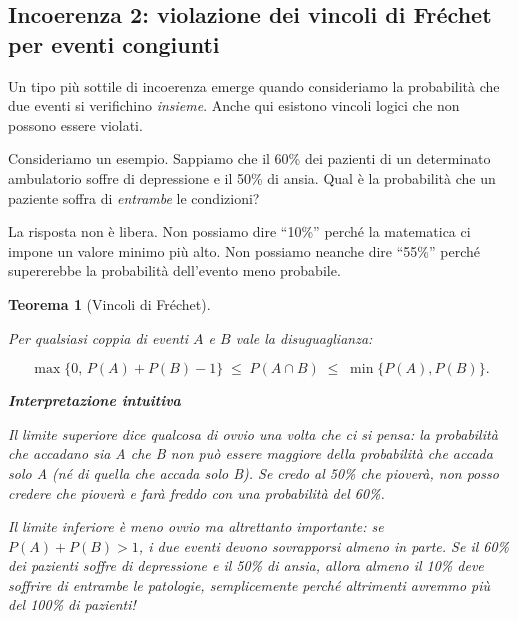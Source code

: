 \documentclass[
  italian,
  letterpaper,
  a4paper,
  11pt,
  open=any]{scrbook}
\theoremstyle{plain}
\newtheorem{theorem}{Teorema}[chapter]
\theoremstyle{definition}
\theoremstyle{definition}
\theoremstyle{remark}
\begin{document}
\subsection{Incoerenza 2: violazione dei vincoli di Fréchet per eventi
congiunti}\label{incoerenza-2-violazione-dei-vincoli-di-fruxe9chet-per-eventi-congiunti}

Un tipo più sottile di incoerenza emerge quando consideriamo la
probabilità che due eventi si verifichino \emph{insieme}. Anche qui
esistono vincoli logici che non possono essere violati.

Consideriamo un esempio. Sappiamo che il 60\% dei pazienti di un
determinato ambulatorio soffre di depressione e il 50\% di ansia. Qual è
la probabilità che un paziente soffra di \emph{entrambe} le condizioni?

La risposta non è libera. Non possiamo dire ``10\%'' perché la
matematica ci impone un valore minimo più alto. Non possiamo neanche
dire ``55\%'' perché supererebbe la probabilità dell'evento meno
probabile.

\begin{theorem}[Vincoli di
Fréchet]\protect\hypertarget{thm-frechet-bounds}{}\label{thm-frechet-bounds}

Per qualsiasi coppia di eventi \(A\) e \(B\) vale la disuguaglianza:

\[
\max\{0,\, P(A) + P(B) - 1\}
\;\leq\;
P(A \cap B)
\;\leq\;
\min\{P(A), P(B)\}.
\]

\textbf{Interpretazione intuitiva}

Il \emph{limite superiore} dice qualcosa di ovvio una volta che ci si
pensa: la probabilità che accadano \emph{sia A che B} non può essere
maggiore della probabilità che accada \emph{solo A} (né di quella che
accada \emph{solo B}). Se credo al 50\% che pioverà, non posso credere
che pioverà \emph{e} farà freddo con una probabilità del 60\%.

Il \emph{limite inferiore} è meno ovvio ma altrettanto importante: se
\(P(A) + P(B) > 1\), i due eventi \emph{devono} sovrapporsi almeno in
parte. Se il 60\% dei pazienti soffre di depressione e il 50\% di ansia,
allora almeno il 10\% deve soffrire di entrambe le patologie,
semplicemente perché altrimenti avremmo più del 100\% di pazienti!

\end{theorem}
\end{document}
